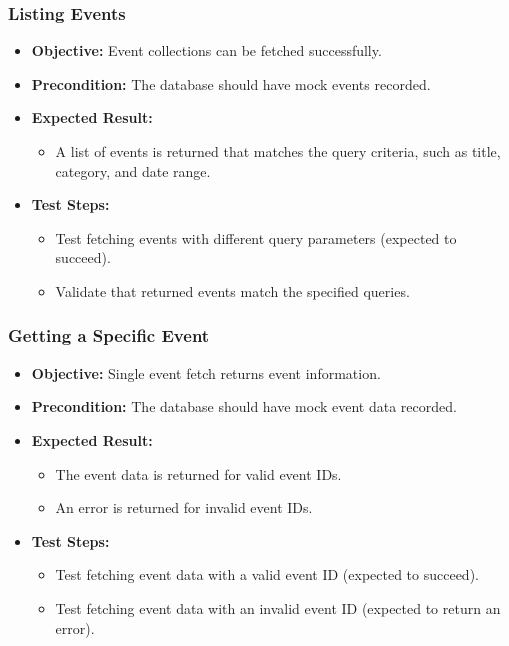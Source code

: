 \subsubsection{Listing Events}
\begin{itemize}
    \item \textbf{Objective:} Event collections can be fetched successfully.
    \item \textbf{Precondition:} The database should have mock events recorded.
    \item \textbf{Expected Result:}
    \begin{itemize}
        \item A list of events is returned that matches the query criteria, such as title, category, and date range.
    \end{itemize}
    \item \textbf{Test Steps:}
    \begin{itemize}
        \item Test fetching events with different query parameters (expected to succeed).
        \item Validate that returned events match the specified queries.
    \end{itemize}
\end{itemize}


\subsubsection{Getting a Specific Event}
\begin{itemize}
    \item \textbf{Objective:} Single event fetch returns event information.
    \item \textbf{Precondition:} The database should have mock event data recorded.
    \item \textbf{Expected Result:}
    \begin{itemize}
        \item The event data is returned for valid event IDs.
        \item An error is returned for invalid event IDs.
    \end{itemize}
    \item \textbf{Test Steps:}
    \begin{itemize}
        \item Test fetching event data with a valid event ID (expected to succeed).
        \item Test fetching event data with an invalid event ID (expected to return an error).
    \end{itemize}
\end{itemize}



